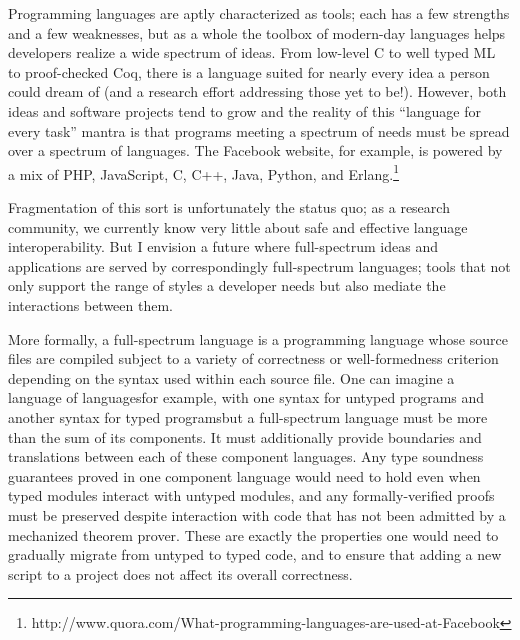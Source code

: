 \documentclass[12pt]{article}
\begin{document}
Programming languages are aptly characterized as tools; each has a few strengths and a few weaknesses, but as a whole the toolbox of modern-day languages helps developers realize a wide spectrum of ideas.
From low-level C to well typed ML to proof-checked Coq, there is a language suited for nearly every idea a person could dream of (and a research effort addressing those yet to be!).
However, both ideas and software projects tend to grow and the reality of this ``language for every task'' mantra is that programs meeting a spectrum of needs must be spread over a spectrum of languages.
The Facebook website, for example, is powered by a mix of PHP, JavaScript, C, C++, Java, Python, and Erlang.\footnote{http://www.quora.com/What-programming-languages-are-used-at-Facebook}

Fragmentation of this sort is unfortunately the status quo; as a research community, we currently know very little about safe and effective language interoperability.
But I envision a future where full-spectrum ideas and applications are served by correspondingly full-spectrum languages; tools that not only support the range of styles a developer needs but also mediate the interactions between them.

More formally, a full-spectrum language is a programming language whose source files are compiled subject to a variety of correctness or well-formedness criterion depending on the syntax used within each source file.
One can imagine a language of languages\textemdash for example, with one syntax for untyped programs and another syntax for typed programs\textemdash but a full-spectrum language must be more than the sum of its components.
It must additionally provide boundaries and translations between each of these component languages.
Any type soundness guarantees proved in one component language would need to hold even when typed modules interact with untyped modules, and any formally-verified proofs must be preserved despite interaction with code that has not been admitted by a mechanized theorem prover.
These are exactly the properties one would need to gradually migrate from untyped to typed code, and to ensure that adding a new script to a project does not affect its overall correctness.
\end{document}
